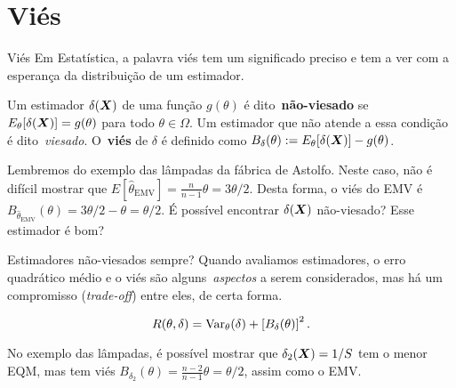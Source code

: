 \section{Viés}
\begin{frame}{Viés}
 Em Estatística, a palavra viés tem um significado preciso e tem a ver com a esperança da distribuição de um estimador.
 \begin{defn}
  \label{def:biased_estimator}
  Um estimador $\delta(\boldsymbol{X})$ de uma função $g(\theta)$ é dito~\textbf{não-viesado} se $E_{\theta}[\delta(\boldsymbol{X})] = g(\theta)$ para todo $\theta \in \Omega$.
  Um estimador que não atende a essa condição é dito~\textit{viesado}.
  O~\textbf{viés} de $\delta$ é definido como $B_\delta(\theta) := E_{\theta}[\delta(\boldsymbol{X})] - g(\theta)$.
 \end{defn}
 \begin{exemplo}
 Lembremos do exemplo das lâmpadas da fábrica de Astolfo. 
 Neste caso, não é difícil mostrar que $E[\hat{\theta}_{\text{EMV}}] = \frac{n}{n-1} \theta = 3\theta/2$.
 Desta forma, o viés do EMV é $B_{\hat{\theta}_{\text{EMV}}}(\theta) = 3\theta/2 -\theta = \theta/2$.
 É possível encontrar $\delta(\boldsymbol{X})$ não-viesado? Esse estimador é bom?
 \end{exemplo}

\end{frame}

\begin{frame}{Estimadores não-viesados sempre?}
Quando avaliamos estimadores, o erro quadrático médio e o viés são alguns~\textit{aspectos} a serem considerados, mas há um compromisso (\textit{trade-off}) entre eles, de certa forma.
 \begin{obs}
  \label{rmk:bias_variance_mse}
  \begin{equation*}
   R(\theta, \delta) = \operatorname{Var}_\theta(\delta) + \left[B_\delta(\theta)\right]^2.
  \end{equation*}
 \end{obs}
 
 No exemplo das lâmpadas, é possível mostrar que $\delta_2(\boldsymbol{X}) = 1/S$ tem o menor EQM, mas tem viés $B_{\delta_2}(\theta) = \frac{n-2}{n-1}\theta = \theta/2$, assim como o EMV.

\end{frame}

